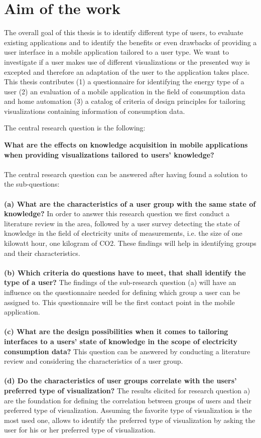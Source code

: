 \section{Aim of the work} 
The overall goal of this thesis is to identify different type of users, to evaluate existing applications and to identify the benefits or even drawbacks of providing a user interface in a mobile application tailored to a user type. We want to investigate if a user makes use of different visualizations or the presented way is excepted and therefore an adaptation of the user to the application takes place.\\
This thesis contributes 
(1) a questionnaire for identifying the energy type of a user 
(2) an evaluation of a mobile application in the field of consumption data and home automation
(3) a catalog of criteria of design principles for tailoring visualizations containing information of consumption data.

The central research question is the following:

\textbf{What are the effects on knowledge acquisition in mobile applications when providing visualizations tailored to users' knowledge?}
\\\\
The central research question can be answered after having found a solution to the sub-questions:\\\\
\textbf{(a) What are the characteristics of a user group with the same state of knowledge?}
In order to answer this research question we first conduct a literature review in the area, followed by a user survey detecting the state of knowledge in the field of electricity units of measurements, i.e. the size of one kilowatt hour, one kilogram of CO2. These findings will help in identifying groups and their characteristics.\\\\
\textbf{(b) Which criteria do questions have to meet, that shall identify the type of a user?}
The findings of the sub-research question (a) will have an influence on the questionnaire needed for defining which group a user can be assigned to. This questionnaire will be the first contact point in the mobile application.
\\\\
\textbf{(c) What are the design possibilities when it comes to tailoring interfaces to a users' state of knowledge in the scope of electricity consumption data?}
This question can be answered by conducting a literature review and considering the characteristics of a user group.
\\\\
\textbf{(d) Do the characteristics of user groups correlate with the users' preferred type of visualization?}
The results elicited for research question a) are the foundation for defining the correlation between groups of users and their preferred type of visualization. Assuming the favorite type of visualization is the most used one, allows to identify the preferred type of visualization by asking the user for his or her preferred type of visualization.

